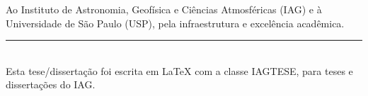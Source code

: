 Ao Instituto de Astronomia, Geofísica e Ciências Atmosféricas (IAG) e à Universidade de São Paulo (USP), pela infraestrutura e excelência acadêmica.

\vfill

\begin{flushleft}
\rule{6cm}{0.5pt}\\
{\footnotesize{Esta tese/dissertação foi escrita em \LaTeX{} com a classe IAGTESE, para teses e dissertações do IAG.}}
\end{flushleft}